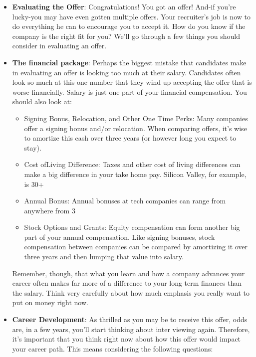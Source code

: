 \documentclass{report}
\begin{document}
\begin{itemize}
            \bigbreak \noindent 
            You can also ask for feedback from the recruiter. In most cases, the big tech companies won't offer feed back, but there are some companies that will. It doesn't hurt to ask a question like, "Is there anything you'd suggest I work on for next time?"
        \item \textbf{Evaluating the Offer}: Congratulations! You got an offer! And-if you're lucky-you may have even gotten multiple offers. Your recruiter's job is now to do everything he can to encourage you to accept it. How do you know if the company is the right fit for you? We'll go through a few things you should consider in evaluating an offer.
        \item \textbf{The financial package}: Perhaps the biggest mistake that candidates make in evaluating an offer is looking too much at their salary. Candidates often look so much at this one number that they wind up accepting the offer that is worse financially. Salary is just one part of your financial compensation. You should also look at:
            \begin{itemize}
                \item Signing Bonus, Relocation, and Other One Time Perks: Many companies offer a signing bonus and/or relocation. When comparing offers, it's wise to amortize this cash over three years (or however long you expect to stay).
                \item Cost ofLiving Difference: Taxes and other cost of living differences can make a big difference in your take home pay. Silicon Valley, for example, is 30+%
                \item Annual Bonus: Annual bonuses at tech companies can range from anywhere from 3%
                \item Stock Options and Grants: Equity compensation can form another big part of your annual compensation. Like signing bonuses, stock compensation between companies can be compared by amortizing it over three years and then lumping that value into salary.
            \end{itemize}
            Remember, though, that what you learn and how a company advances your career often makes far more of a difference to your long term finances than the salary. Think very carefully about how much emphasis you really want to put on money right now.
        \item \textbf{Career Development}: As thrilled as you may be to receive this offer, odds are, in a few years, you'll start thinking about inter viewing again. Therefore, it's important that you think right now about how this offer would impact your career path. This means considering the following questions:

\end{itemize}
\end{document}
